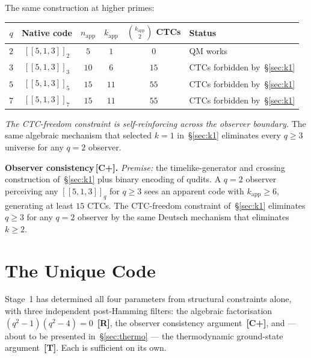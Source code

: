 \documentclass[11pt,a4paper]{article}
\newcommand{\Rmark}{\textcolor{green!50!black}{\textbf{[R]}}}
\newcommand{\Cpmark}{\textcolor{blue!70!black}{\textbf{[C+]}}}
\newcommand{\Tmark}{\textcolor{orange!70!black}{\textbf{[T]}}}
\newcommand{\Cq}[4]{[\![#1,#2,#3]\!]_{#4}}
\newcommand{\nApp}{n_{\mathrm{app}}}
\newcommand{\kApp}{k_{\mathrm{app}}}
\begin{document}
The same construction at higher primes:

\begin{center}
\renewcommand{\arraystretch}{1.25}
\begin{tabular}{cccccl}
\toprule
$q$ & Native code & $\nApp$ & $\kApp$ & $\binom{\kApp}{2}$ CTCs & Status \\
\midrule
$2$ & $\Cq{5}{1}{3}{2}$ & $5$  & $1$  & $0$  & QM works \\
$3$ & $\Cq{5}{1}{3}{3}$ & $10$ & $6$  & $15$ & CTCs forbidden by~\S\ref{sec:k1} \\
$5$ & $\Cq{5}{1}{3}{5}$ & $15$ & $11$ & $55$ & CTCs forbidden by~\S\ref{sec:k1} \\
$7$ & $\Cq{5}{1}{3}{7}$ & $15$ & $11$ & $55$ & CTCs forbidden by~\S\ref{sec:k1} \\
\bottomrule
\end{tabular}
\end{center}

\noindent
\emph{The CTC-freedom constraint is self-reinforcing across the observer boundary.} The same algebraic mechanism that selected $k=1$ in~\S\ref{sec:k1} eliminates every $q\geq3$ universe for any $q=2$ observer.

\begin{mdframed}[backgroundcolor=Cpbg,linecolor=Cpcolor,linewidth=1.5pt]
\textbf{Observer consistency\,\Cpmark.}\quad
\emph{Premise:} the timelike-generator and crossing construction of~\S\ref{sec:k1} plus binary encoding of qudits. A $q=2$ observer perceiving any $\Cq{5}{1}{3}{q}$ for $q\geq3$ sees an apparent code with $\kApp\geq6$, generating at least $15$ CTCs. The CTC-freedom constraint of~\S\ref{sec:k1} eliminates $q\geq3$ for any $q=2$ observer by the same Deutsch mechanism that eliminates $k\geq2$.
\end{mdframed}

\section{The Unique Code}
\label{sec:unique}

Stage~1 has determined all four parameters from structural constraints alone, with three independent post-Hamming filters: the algebraic factorisation $(q^2-1)(q^2-4)=0$~\Rmark, the observer consistency argument~\Cpmark, and --- about to be presented in~\S\ref{sec:thermo} --- the thermodynamic ground-state argument~\Tmark. Each is sufficient on its own.
\end{document}
